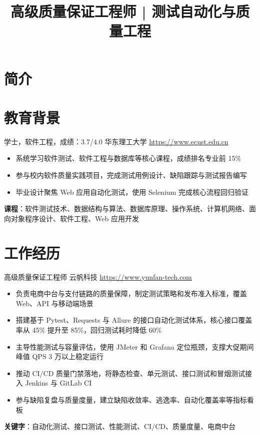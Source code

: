 \documentclass[a4paper, serif, 10pt]{moderncv}
\title{高级质量保证工程师 | 测试自动化与质量工程}
\begin{document}
\maketitle

\section{简介}

\section{教育背景}

        {学士，软件工程，成绩：3.7/4.0}
        {华东理工大学}
        {\url{https://www.ecust.edu.cn}}
        {}
        {\begin{itemize}
\item 系统学习软件测试、软件工程与数据库等核心课程，成绩排名专业前 15\%
\item 参与校内软件质量实践项目，完成测试用例设计、缺陷跟踪与测试报告编写
\item 毕业设计聚焦 Web 应用自动化测试，使用 Selenium 完成核心流程回归验证
\end{itemize}
\textbf{课程}：软件测试技术、数据结构与算法、数据库原理、操作系统、计算机网络、面向对象程序设计、软件工程、Web 应用开发}
\section{工作经历}

        {高级质量保证工程师}
        {云帆科技}
        {\url{https://www.yunfan-tech.com}}
        {}
        {\begin{itemize}
\item 负责电商中台与支付链路的质量保障，制定测试策略和发布准入标准，覆盖 Web、API 与移动端场景
\item 搭建基于 Pytest、Requests 与 Allure 的接口自动化测试体系，核心接口覆盖率从 45\% 提升至 85\%，回归测试耗时降低 60\%
\item 主导性能测试与容量评估，使用 JMeter 和 Grafana 定位瓶颈，支撑大促期间峰值 QPS 3 万以上稳定运行
\item 推动 CI/CD 质量门禁落地，将静态检查、单元测试、接口测试和冒烟测试接入 Jenkins 与 GitLab CI
\item 参与缺陷复盘与质量度量，建立缺陷收敛率、逃逸率、自动化覆盖率等指标看板
\end{itemize}
\textbf{关键字}：自动化测试、接口测试、性能测试、CI/CD、质量度量、电商中台}
\end{document}
